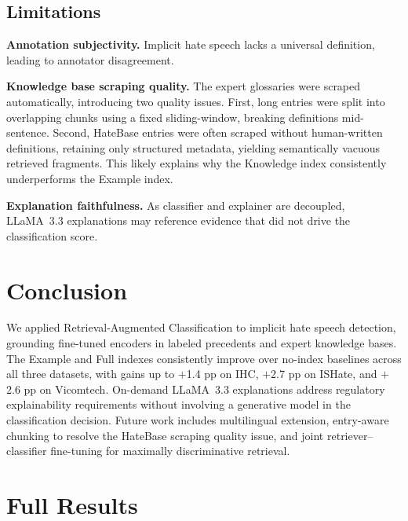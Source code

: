 \documentclass{article}
\begin{document}
\subsection{Limitations}
\label{sec:limits}
\textbf{Annotation subjectivity.} Implicit hate speech lacks a universal definition, leading to annotator disagreement.

\textbf{Knowledge base scraping quality.}
The expert glossaries were scraped automatically, introducing two quality issues. First, long entries were split into overlapping chunks using a fixed sliding-window, breaking definitions mid-sentence. Second, HateBase entries were often scraped without human-written definitions, retaining only structured metadata, yielding semantically vacuous retrieved fragments. This likely explains why the Knowledge index consistently underperforms the Example index.

\textbf{Explanation faithfulness.} As classifier and explainer are decoupled, LLaMA~3.3 explanations may reference evidence that did not drive the classification score.


\section{Conclusion}
\label{sec:conclusion}

We applied Retrieval-Augmented Classification to implicit hate speech detection, grounding fine-tuned encoders in labeled precedents and expert knowledge bases. The Example and Full indexes consistently improve over no-index baselines across all three datasets, with gains up to $+$1.4 pp on IHC, $+$2.7 pp on ISHate, and $+$2.6 pp on Vicomtech. On-demand LLaMA~3.3 explanations address regulatory explainability requirements without involving a generative model in the classification decision. Future work includes multilingual extension, entry-aware chunking to resolve the HateBase scraping quality issue, and joint retriever--classifier fine-tuning for maximally discriminative retrieval.


{\tiny
\setlength{\bibsep}{2pt}


}



\appendix
\onecolumn

\section{Full Results}
\end{document}
